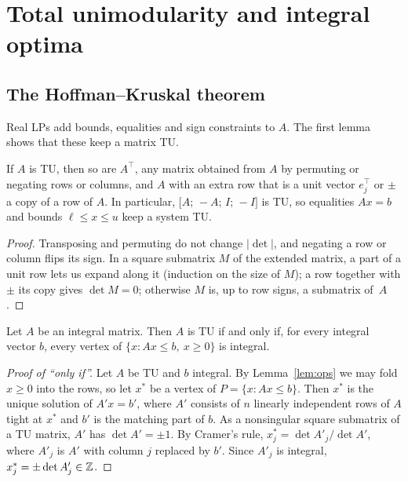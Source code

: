 \section{Total unimodularity and integral optima}\label{sec:tu}

\subsection{The Hoffman--Kruskal theorem}\label{sec:hk}

Real LPs add bounds, equalities and sign constraints to $A$. The first lemma shows that these keep a matrix TU.

\begin{lemma}\label{lem:ops}
  If $A$ is TU, then so are $A^\top$, any matrix obtained from $A$ by permuting or negating rows or columns, and $A$ with an extra row that is a unit vector $e_j^\top$ or $\pm$ a copy of a row of $A$. In particular, $\bigl[A;\,-A;\,I;\,-I\bigr]$ is TU, so equalities $Ax=b$ and bounds $\ell\le x\le u$ keep a system TU.
\end{lemma}
\begin{proof}
  Transposing and permuting do not change $|\det|$, and negating a row or column flips its sign. In a square submatrix $M$ of the extended matrix, a part of a unit row lets us expand along it (induction on the size of $M$); a row together with $\pm$ its copy gives $\det M=0$; otherwise $M$ is, up to row signs, a submatrix of~$A$.
\end{proof}

\begin{theorem}\label{thm:hk}
  Let $A$ be an integral matrix. Then $A$ is TU if and only if, for every integral vector $b$, every vertex of $\{x : Ax\le b,\ x\ge 0\}$ is integral.
\end{theorem}
\begin{proof}[Proof of ``only if'']
  Let $A$ be TU and $b$ integral. By Lemma~\ref{lem:ops} we may fold $x\ge 0$ into the rows, so let $x^*$ be a vertex of $P=\{x : Ax\le b\}$. Then $x^*$ is the unique solution of $A'x=b'$, where $A'$ consists of $n$ linearly independent rows of $A$ tight at $x^*$ and $b'$ is the matching part of $b$. As a nonsingular square submatrix of a TU matrix, $A'$ has $\det A'=\pm1$. By Cramer's rule, $x^*_j = \det A'_j / \det A'$, where $A'_j$ is $A'$ with column $j$ replaced by $b'$. Since $A'_j$ is integral, $x^*_j = \pm\det A'_j\in\mathbb{Z}$.
\end{proof}

